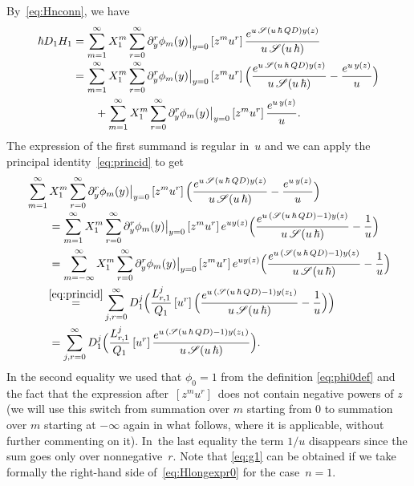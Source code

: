 \documentclass[JEP,XML,SOM,Unicode,NoEqCountersInSection,NoFloatCountersInSection]{cedram}
\let\mathcal\mathscr
\theoremstyle{plain}
\theoremstyle{definition}
\theoremstyle{remark}
\newcommand{\cS}{\mathcal{S}}
\begin{document}
By~\eqref{eq:Hnconn}, we have\vspace*{-3pt}
\begin{equation}
\begin{aligned}\label{eq:DHg1step1}
\hbar D_1H_{1}
&=\sum_{m=1}^\infty X_1^m\sum_{r=0}^\infty
\partial_y^r\phi_m(y)\big|_{y=0}\,[z^{m}u^r]\,
\frac{e^{u\,\cS(u\,\hbar\,Q D)y(z)}}{u\,\cS(u\,\hbar)}\\[-2pt]
&=\sum_{m=1}^\infty X_1^m\sum_{r=0}^\infty
\partial_y^r\phi_m(y)\big|_{y=0}\,[z^{m}u^r]\,\Bigl(
\frac{e^{u\,\cS(u\,\hbar\,Q D)y(z)}}{u\,\cS(u\,\hbar)}-
\frac{e^{u\,y(z)}}{u}\Bigr)
\\
&\qquad
+\sum_{m=1}^\infty X_1^m\sum_{r=0}^\infty
\partial_y^r\phi_m(y)\big|_{y=0}\,[z^{m}u^r]\,
\frac{e^{u\,y(z)}}{u}.
\end{aligned}
\end{equation}
The expression of the first summand is regular in~$u$ and we can apply the principal identity~\eqref{eq:princid} to get\vspace*{-3pt}
\begin{equation}\label{eq:g1}
\begin{aligned}
&\sum_{m=1}^\infty X_1^m\sum_{r=0}^\infty
\partial_y^r\phi_m(y)\big|_{y=0}\,[z^{m}u^r]\,\Bigl(
\frac{e^{u\,\cS(u\,\hbar\,Q D)y(z)}}{u\,\cS(u\,\hbar)}-
\frac{e^{u\,y(z)}}{u}\Bigr)\\[-2pt]
&\qquad=\sum_{m=1}^\infty X_1^m\sum_{r=0}^\infty
\partial_y^r\phi_m(y)\big|_{y=0}\,[z^{m}u^r]\,e^{uy(z)}\Bigl(
\frac{e^{u\,(\cS(u\,\hbar\,Q D)-1)y(z)}}{u\,\cS(u\,\hbar)}-
\frac{1}{u}\Bigr)\\
&\qquad=\sum_{m=-\infty}^\infty X_1^m\sum_{r=0}^\infty
\partial_y^r\phi_m(y)\big|_{y=0}\,[z^{m}u^r]\,e^{uy(z)}\Bigl(
\frac{e^{u\,(\cS(u\,\hbar\,Q D)-1)y(z)}}{u\,\cS(u\,\hbar)}-
\frac{1}{u}\Bigr)\\
&\qquad\!\mathop{=}^{\eqref{eq:princid}}
\sum_{j,r=0}^\infty D_1^j \Bigl(\frac{L_{r,1}^j}{Q_1}
\,[u^r]\, \Bigl(\frac{e^{u\,(\cS(u\,\hbar\,Q D)-1)y(z_1)}}{u\,\cS(u\,\hbar)}-\dfrac{1}{u} \Bigr) \Bigr)\\
&\qquad=
\sum_{j,r=0}^\infty D_1^j \Bigl(\frac{L_{r,1}^j}{Q_1}
\,[u^r]\, \frac{e^{u\,(\cS(u\,\hbar\,Q D)-1)y(z_1)}}{u\,\cS(u\,\hbar)} \Bigr).
\end{aligned}
\end{equation}
In the second equality we used that $\phi_0=1$ from the definition \eqref{eq:phi0def} and the fact that the expression after $\,[z^mu^r]\,$ does not contain negative powers of $z$ (we will use this switch from summation over $m$ starting from $0$ to summation over $m$ starting at $-\infty$ again in what follows, where it is applicable, without further commenting on it).
In~the last equality the term $1/u$ disappears since the sum goes only over nonnegative~$r$.
Note that \eqref{eq:g1} can be obtained if we take formally the right-hand side of~\eqref{eq:Hlongexpr0} for the case~$n=1$.
\end{document}
